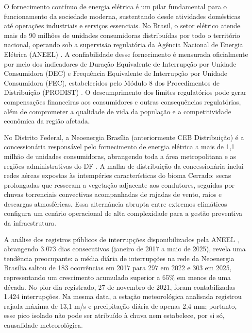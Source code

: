 O fornecimento contínuo de energia elétrica é um pilar fundamental para o funcionamento da sociedade moderna, sustentando desde atividades domésticas até operações industriais e serviços essenciais. No Brasil, o setor elétrico atende mais de 90 milhões de unidades consumidoras distribuídas por todo o território nacional, operando sob a supervisão regulatória da Agência Nacional de Energia Elétrica (ANEEL) \cite{aneel2023relatorio}. A confiabilidade desse fornecimento é mensurada oficialmente por meio dos indicadores de Duração Equivalente de Interrupção por Unidade Consumidora (DEC) e Frequência Equivalente de Interrupção por Unidade Consumidora (FEC), estabelecidos pelo Módulo 8 dos Procedimentos de Distribuição (PRODIST) \cite{aneel2023prodist}. O descumprimento dos limites regulatórios pode gerar compensações financeiras aos consumidores e outras consequências regulatórias, além de comprometer a qualidade de vida da população e a competitividade econômica da região afetada.

No Distrito Federal, a Neoenergia Brasília (anteriormente CEB Distribuição) é a concessionária responsável pelo fornecimento de energia elétrica a mais de 1,1 milhão de unidades consumidoras, abrangendo toda a área metropolitana e as regiões administrativas do DF \cite{neoenergia2023relatorio}. A malha de distribuição da concessionária inclui redes aéreas expostas às intempéries características do bioma Cerrado: secas prolongadas que ressecam a vegetação adjacente aos condutores, seguidas por chuvas torrenciais convectivas acompanhadas de rajadas de vento, raios e descargas atmosféricas. Essa alternância abrupta entre extremos climáticos configura um cenário operacional de alta complexidade para a gestão preventiva da infraestrutura.

A análise dos registros públicos de interrupções disponibilizados pela ANEEL \cite{aneel2026interrupcoes}, abrangendo 3.073 dias consecutivos (janeiro de 2017 a maio de 2025), revela uma tendência preocupante: a média diária de interrupções na rede da Neoenergia Brasília saltou de 183 ocorrências em 2017 para 297 em 2022 e 303 em 2025, representando um crescimento acumulado superior a 65\% em menos de uma década. No pior dia registrado, 27 de novembro de 2021, foram contabilizadas 1.424 interrupções. Na mesma data, a estação meteorológica analisada registrou rajada máxima de 13,1 m/s e precipitação diária de apenas 2,4 mm; portanto, esse pico isolado não pode ser atribuído à chuva nem estabelece, por si só, causalidade meteorológica.

